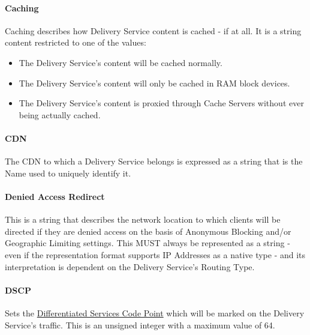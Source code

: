 \paragraph{Caching}
Caching describes how Delivery Service content is cached - if at all. It is a
string content restricted to one of the values:

\begin{itemize}
	\item {} The Delivery Service's content will be cached normally.
	\item {} The Delivery Service's content will only be cached
	in RAM block devices.
	\item {} The Delivery Service's content is proxied through
	Cache Servers without ever being actually cached.
\end{itemize}

\paragraph{CDN}
The CDN to which a Delivery Service belongs is expressed as a string that is the
Name used to uniquely identify it.


\paragraph{Denied Access Redirect}
This is a string that describes the network location to which clients will be
directed if they are denied access on the basis of Anonymous Blocking and/or
Geographic Limiting settings. This MUST always be represented as a string - even
if the representation format supports IP Addresses as a native type - and its
interpretation is dependent on the Delivery Service's Routing Type.

\paragraph{DSCP}
Sets the
\href{https://tools.ietf.org/html/rfc2474}{Differentiated Services Code Point}
which will be marked on the Delivery Service's traffic. This is an unsigned
integer with a maximum value of 64.


